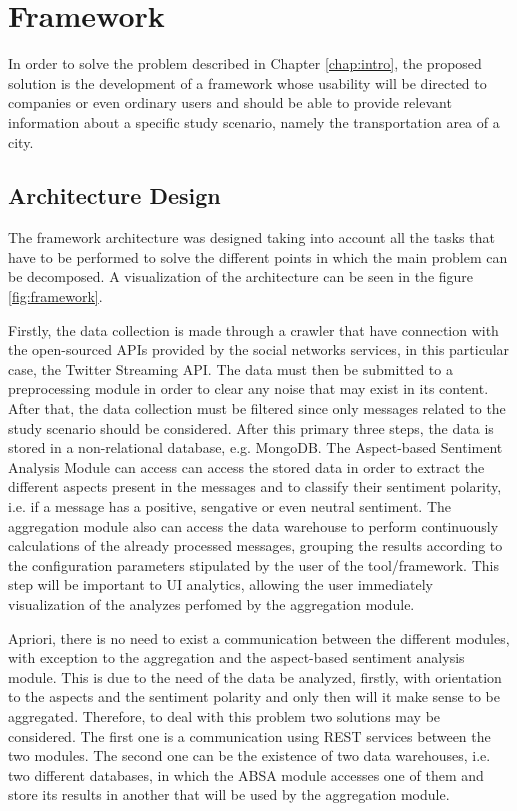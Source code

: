 \section{Framework}

In order to solve the problem described in Chapter \ref{chap:intro}, the proposed solution is the development of a framework whose usability will be directed to companies or even ordinary users and should be able to provide relevant information about a specific study scenario, namely the transportation area of a city.

\subsection{Architecture Design} \label{sec:architecture}

The framework architecture was designed taking into account all the tasks that have to be performed to solve the different points in which the main problem can be decomposed. A visualization of the architecture can be seen in the figure \ref{fig:framework}.

Firstly, the data collection is made through a crawler that have connection with the open-sourced APIs provided by the social networks services, in this particular case, the Twitter Streaming API. The data must then be submitted to a preprocessing module in order to clear any noise that may exist in its content. After that, the data collection must be filtered since only messages related to the study scenario should be considered. After this primary three steps, the data is stored in a non-relational database, e.g. MongoDB. The Aspect-based Sentiment Analysis Module can access can access the stored data in order to extract the different aspects present in the messages and to classify their sentiment polarity, i.e. if a message has a positive, sengative or even neutral sentiment. The aggregation module also can access the data warehouse to perform continuously calculations of the already processed messages, grouping the results according to the configuration parameters stipulated by the user of the tool/framework. This step will be important to UI analytics, allowing the user immediately visualization of the analyzes perfomed by the aggregation module.

Apriori, there is no need to exist a communication between the different modules, with exception to the aggregation and the aspect-based sentiment analysis module. This is due to the need of the data be analyzed, firstly, with orientation to the aspects and the sentiment polarity and only then will it make sense to be aggregated. Therefore, to deal with this problem two solutions may be considered. The first one is a communication using REST services between the two modules. The second one can be the existence of two data warehouses, i.e. two different databases, in which the ABSA module accesses one of them and store its results in another that will be used by the aggregation module.

